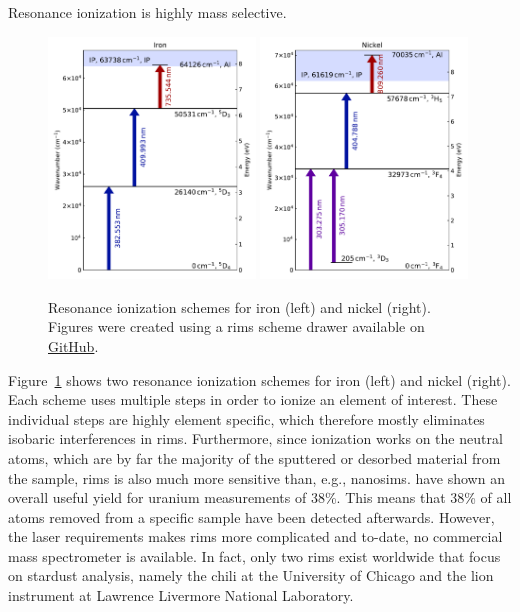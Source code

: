 Resonance ionization is highly mass selective. 
\begin{figure}[tb]
    \centering
    \includegraphics[width=0.49\textwidth]{graphics/stardust/fe_ionization_scheme}
    \includegraphics[width=0.49\textwidth]{graphics/stardust/ni_ionization_scheme}
    \caption{Resonance ionization schemes for iron (left) and nickel (right). Figures were created using a \ac{rims} scheme drawer available on \href{https://github.com/RIMS-Code/RIMSSchemeDrawer}{GitHub}.}
    \label{fig:stardust:fe_ni_ionization_schemes}
\end{figure}
Figure~\ref{fig:stardust:fe_ni_ionization_schemes} shows two resonance ionization schemes for iron (left) and nickel (right). Each scheme uses multiple steps in order to ionize an element of interest. These individual steps are highly element specific, which therefore mostly eliminates isobaric interferences in \ac{rims}. Furthermore, since ionization works on the neutral atoms, which are by far the majority of the sputtered or desorbed material from the sample, \ac{rims} is also much more sensitive than, e.g., \ac{nanosims}. \citet{savina18} have shown an overall useful yield for uranium measurements of 38\%. This means that 38\% of all atoms removed from a specific sample have been detected afterwards. However, the laser requirements makes \ac{rims} more complicated and to-date, no commercial mass spectrometer is available. In fact, only two \ac{rims} exist worldwide that focus on stardust analysis, namely the \ac{chili} at the University of Chicago and the \ac{lion} instrument at Lawrence Livermore National Laboratory. 

